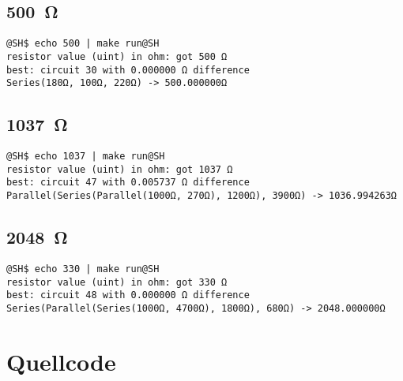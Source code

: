 \documentclass[a4paper,10pt,ngerman]{scrartcl}
\newcommand{\myohm}[1]{\SI{#1}{\ohm}}
\begin{document}
\subsection{\myohm{500}}
\begin{lstlisting}
@SH$ echo 500 | make run@SH
resistor value (uint) in ohm: got 500 Ω
best: circuit 30 with 0.000000 Ω difference
Series(180Ω, 100Ω, 220Ω) -> 500.000000Ω
\end{lstlisting}

\subsection{\myohm{1037}}
\begin{lstlisting}
@SH$ echo 1037 | make run@SH
resistor value (uint) in ohm: got 1037 Ω
best: circuit 47 with 0.005737 Ω difference
Parallel(Series(Parallel(1000Ω, 270Ω), 1200Ω), 3900Ω) -> 1036.994263Ω
\end{lstlisting}

\subsection{\myohm{2048}}
\begin{lstlisting}
@SH$ echo 330 | make run@SH
resistor value (uint) in ohm: got 330 Ω
best: circuit 48 with 0.000000 Ω difference
Series(Parallel(Series(1000Ω, 4700Ω), 1800Ω), 680Ω) -> 2048.000000Ω
\end{lstlisting}


\pagebreak
\section{Quellcode}
\end{document}
